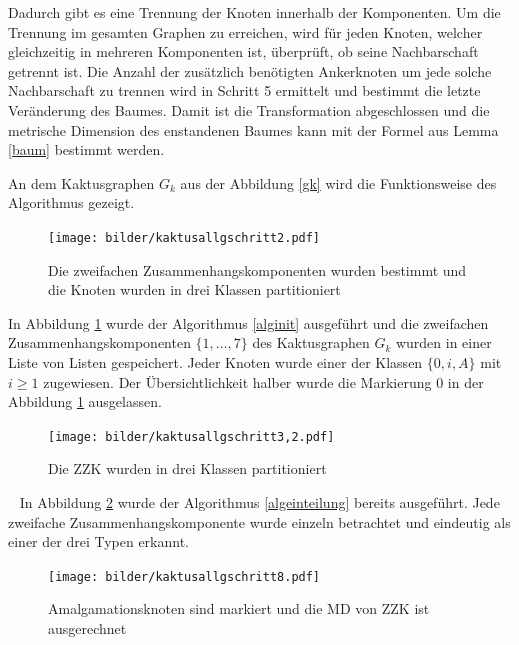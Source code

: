 Dadurch gibt es eine Trennung der Knoten innerhalb der Komponenten. Um die Trennung im gesamten Graphen zu erreichen, wird für jeden Knoten, welcher gleichzeitig in mehreren Komponenten ist, überprüft, ob seine Nachbarschaft getrennt ist. Die Anzahl der zusätzlich benötigten Ankerknoten um jede solche Nachbarschaft zu trennen wird in Schritt 5 ermittelt und bestimmt die letzte Veränderung des Baumes. Damit ist die Transformation abgeschlossen und die metrische Dimension des enstandenen Baumes kann mit der Formel aus Lemma \ref{baum} bestimmt werden.
\begin{bsp} An dem Kaktusgraphen $G_k$ aus der Abbildung \ref{gk} wird die Funktionsweise des Algorithmus gezeigt.\newline
\vspace{-3mm}
 	   	 \begin{figure}[h!]
		\centering
 		 \texttt{[image: bilder/kaktusallgschritt2.pdf]}
   \caption{Die zweifachen Zusammenhangskomponenten wurden bestimmt und die Knoten wurden in drei Klassen partitioniert}
      \label{kaktus1}
  	 \end{figure} 
\newpage
In Abbildung \ref{kaktus1} wurde der Algorithmus \ref{alginit} ausgeführt und die zweifachen Zusammenhangskomponenten $\{1, \ldots, 7\}$ des Kaktusgraphen $G_k$ wurden in einer Liste von Listen gespeichert. Jeder Knoten wurde einer der Klassen $\{0,i,A\}$ mit $i \geq 1$ zugewiesen. Der Übersichtlichkeit halber wurde die Markierung $0$ in der Abbildung \ref{kaktus1} ausgelassen.
\vspace{-3mm} 	   	 
 	   	 \begin{figure}[h!]
		\centering
 		 \texttt{[image: bilder/kaktusallgschritt3,2.pdf]}
   \caption{Die ZZK wurden in drei Klassen partitioniert}
      \label{kaktus1.2}
  	 \end{figure}
\vspace{-3mm}
  	 ~\linebreak
In Abbildung \ref{kaktus1.2} wurde der Algorithmus \ref{algeinteilung} bereits ausgeführt. Jede zweifache Zusammenhangskomponente wurde einzeln betrachtet und eindeutig als einer der drei Typen erkannt.\\
\vspace{-6mm}
  	   	\begin{figure}[h!]
		\centering
 		 \texttt{[image: bilder/kaktusallgschritt8.pdf]}
   \caption{Amalgamationsknoten sind markiert und die MD von ZZK ist ausgerechnet}
\label{kaktus2}  	
  	 \end{figure}
  	 \vspace{-3mm}

\end{bsp}
